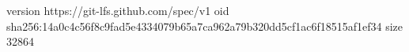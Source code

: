 version https://git-lfs.github.com/spec/v1
oid sha256:14a0c4c56f8c9fad5e4334079b65a7ca962a79b320dd5cf1ac6f18515af1ef34
size 32864

